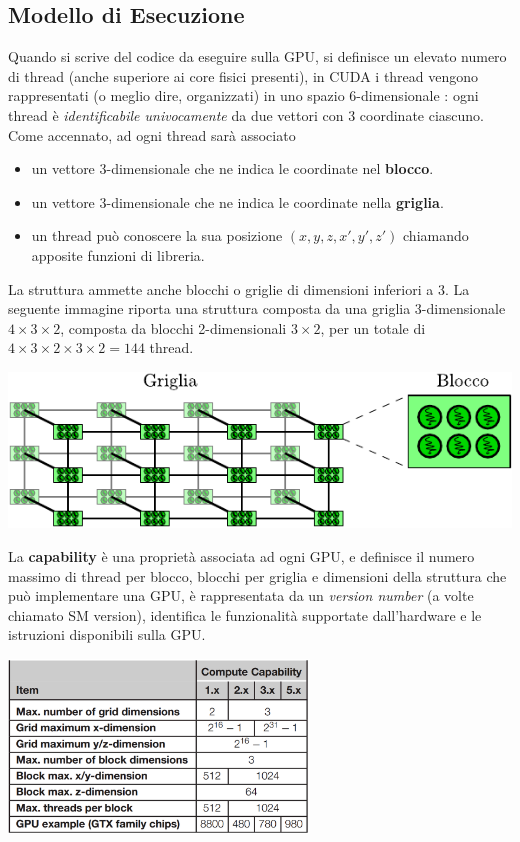 \documentclass[10pt, letterpaper]{report}
\begin{document}
\subsection{Modello di Esecuzione}
Quando si scrive del codice da eseguire sulla GPU, si definisce un elevato numero di thread (anche superiore ai core fisici presenti), in CUDA i thread vengono rappresentati (o meglio dire, organizzati) in uno spazio 6-dimensionale : ogni thread è \textit{identificabile univocamente} da due vettori con 3 coordinate ciascuno. \acc 
Come accennato, ad ogni thread sarà associato \begin{itemize}
    \item un vettore 3-dimensionale che ne indica le coordinate nel \textbf{blocco}.
    \item un vettore 3-dimensionale che ne indica le coordinate nella \textbf{griglia}.
    \item un thread può conoscere la sua posizione $(x,y,z,x',y',z')$ chiamando apposite funzioni di libreria.
\end{itemize}
La struttura ammette anche blocchi o griglie di dimensioni inferiori a 3. La seguente immagine riporta una struttura composta da una griglia 3-dimensionale $4\times 3\times 2$, composta da blocchi 2-dimensionali $3\times 2$, per un totale di $4\times 3\times 2\times 3\times 2=144$ thread.
\begin{center}
    \includegraphics[width=\textwidth ]{images/strutturaGrigliaCuda.pdf}
\end{center}
La \textbf{capability} è una proprietà associata ad ogni GPU, e definisce il numero massimo di thread per blocco, blocchi per griglia e dimensioni della struttura che può implementare una GPU, è rappresentata da un \textit{version number} (a volte chiamato SM version), identifica le funzionalità supportate dall'hardware e le istruzioni disponibili sulla GPU.\begin{center}
    \includegraphics[width=0.6\textwidth ]{images/capability.png}
\end{center}
\flowerLine 
\end{document}
